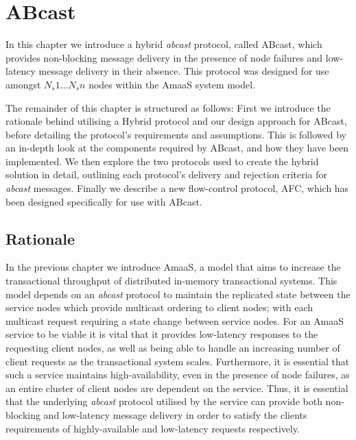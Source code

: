 \chapter{ABcast}\label{ch:abcast}

    \graphicspath{{Chapter4-ABcast/Figs/Vector/}{Chapter4-ABcast/Figs/}}

In this chapter we  introduce a hybrid \emph{abcast} protocol, called \textsf{ABcast}, which provides non-blocking message delivery in the presence of node failures and low-latency message delivery in their absence.  This protocol was designed for use amongst $N_s1 \ldots N_sn$ nodes within the \textsf{AmaaS} system model.  

The remainder of this chapter is structured as follows:  First we introduce the rationale behind utilising a Hybrid protocol and our design approach for \textsf{ABcast}, before detailing the protocol's requirements and assumptions.  This is followed by an in-depth look at the components required by \textsf{ABcast}, and how they have been implemented.  We then explore the two protocols used to create the hybrid solution in detail, outlining each protocol's delivery and rejection criteria for \emph{abcast} messages. Finally we describe a new flow-control protocol, AFC, which has been designed specifically for use with \textsf{ABcast}.  

\section{Rationale}
    In the previous chapter we introduce \textsf{AmaaS}, a model that aims to increase the transactional throughput of distributed in-memory transactional systems.  This model depends on an \emph{abcast} protocol to maintain the replicated state between the service nodes which provide multicast ordering to client nodes; with each multicast request requiring a state change between service nodes.  For an \textsf{AmaaS} service to be viable it is vital that it provides low-latency responses to the requesting client nodes, as well as being able to handle an increasing number of client requests as the transactional system scales.  Furthermore, it is essential that such a service maintains high-availability, even in the presence of node failures, as an entire cluster of client nodes are dependent on the service.  Thus, it is essential that the underlying \emph{abcast} protocol utilised by the service can provide both non-blocking and low-latency message delivery in order to satisfy the clients requirements of highly-available and low-latency requests respectively.  
    
